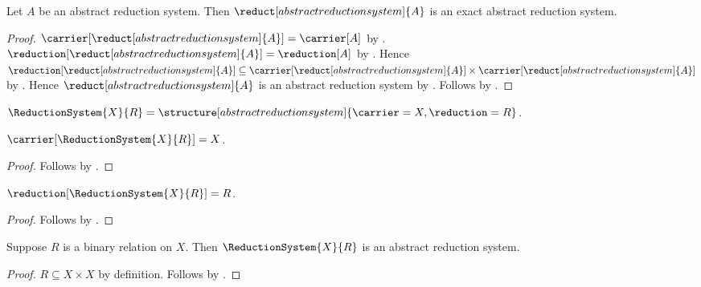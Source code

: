 \begin{theorem}\label{abstract_reduction_system_reduct_is_exact}
    Let $A$ be an abstract reduction system.
    Then $\reduct[abstract reduction system]{A}$ is an exact
        abstract reduction system.
\end{theorem}
\begin{proof}
    $\carrier[\reduct[abstract reduction system]{A}]=\carrier[A]$
        by .
    $\reduction[\reduct[abstract reduction system]{A}]=\reduction[A]$
        by .
    Hence $\reduction[\reduct[abstract reduction system]{A}]\subseteq
        \carrier[\reduct[abstract reduction system]{A}]\times
        \carrier[\reduct[abstract reduction system]{A}]$
        by .
    Hence $\reduct[abstract reduction system]{A}$ is an abstract reduction
        system by .
    Follows by .
\end{proof}

\begin{definition}\label{reduction_system_from_relation}
    $\ReductionSystem{X}{R}=
        \structure[abstract reduction system]{
            \carrier=X,
            \reduction=R
        }$.
\end{definition}

\begin{proposition}\label{reduction_system_from_relation_carrier}
    $\carrier[\ReductionSystem{X}{R}]=X$.
\end{proposition}
\begin{proof}
    Follows by .
\end{proof}

\begin{proposition}\label{reduction_system_from_relation_reduction}
    $\reduction[\ReductionSystem{X}{R}]=R$.
\end{proposition}
\begin{proof}
    Follows by .
\end{proof}

\begin{classification}\label{reduction_system_from_relation_is_system}
    Suppose $R$ is a binary relation on $X$.
    Then $\ReductionSystem{X}{R}$ is an abstract reduction system.
\end{classification}
\begin{proof}
    $R\subseteq X\times X$ by definition.
    Follows by .
\end{proof}

